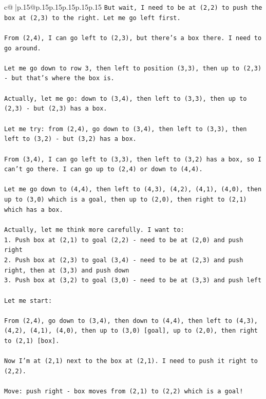 \documentclass{article}
\begin{document}
{\begin{supertabular}{c@{$\;$}|p{.15\linewidth}@{}p{.15\linewidth}p{.15\linewidth}p{.15\linewidth}p{.15\linewidth}p{.15\linewidth}}
{{{\texttt{But wait, I need to be at (2,2) to push the box at (2,3) to the right. Let me go left first.} \\
\\ 
\texttt{From (2,4), I can go left to (2,3), but there's a box there. I need to go around.} \\
\\ 
\texttt{Let me go down to row 3, then left to position (3,3), then up to (2,3) {-} but that's where the box is.} \\
\\ 
\texttt{Actually, let me go: down to (3,4), then left to (3,3), then up to (2,3) {-} but (2,3) has a box.} \\
\\ 
\texttt{Let me try: from (2,4), go down to (3,4), then left to (3,3), then left to (3,2) {-} but (3,2) has a box.} \\
\\ 
\texttt{From (3,4), I can go left to (3,3), then left to (3,2) has a box, so I can't go there. I can go up to (2,4) or down to (4,4).} \\
\\ 
\texttt{Let me go down to (4,4), then left to (4,3), (4,2), (4,1), (4,0), then up to (3,0) which is a goal, then up to (2,0), then right to (2,1) which has a box.} \\
\\ 
\texttt{Actually, let me think more carefully. I want to:} \\
\texttt{1. Push box at (2,1) to goal (2,2) {-} need to be at (2,0) and push right} \\
\texttt{2. Push box at (2,3) to goal (3,4) {-} need to be at (2,3) and push right, then at (3,3) and push down} \\
\texttt{3. Push box at (3,2) to goal (3,0) {-} need to be at (3,3) and push left} \\
\\ 
\texttt{Let me start:} \\
\\ 
\texttt{From (2,4), go down to (3,4), then down to (4,4), then left to (4,3), (4,2), (4,1), (4,0), then up to (3,0) {[}goal{]}, up to (2,0), then right to (2,1) {[}box{]}.} \\
\\ 
\texttt{Now I'm at (2,1) next to the box at (2,1). I need to push it right to (2,2).} \\
\\ 
\texttt{Move: push right {-} box moves from (2,1) to (2,2) which is a goal!} \\
}}}
\end{supertabular}}
\end{document}
